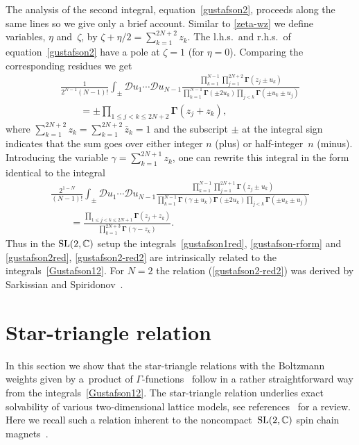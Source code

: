 \documentclass[pdftex]{sigma}
\numberwithin{equation}{section}
\begin{document}
The analysis of the second integral, equation~\eqref{gustafson2}, proceeds along the same lines so we give only a brief account. Similar to \eqref{zeta-wz} we define variables, $\eta$ and~$\zeta$, by $\zeta+\eta/2=\sum\limits_{k=1}^{2N+2} z_k$. The l.h.s.\ and r.h.s.\ of equation~\eqref{gustafson2} have a pole at $\zeta=1$ (for $\eta=0$). Comparing the corresponding residues we get
\begin{gather}
\frac1{2^{N-1}(N-1)!} \int_\pm \mathcal D u_1\cdots \mathcal D u_{N-1}
\frac{ \prod\limits_{k=1}^{N-1} \prod\limits_{j=1}^{2N+2} \boldsymbol{\Gamma}(z_j\pm u_k)}
{\prod\limits_{k=1}^{N-1}{\boldsymbol{\Gamma}}(\pm 2u_k) \prod\limits_{j<k} {\boldsymbol{\Gamma}} (\pm u_k\pm u_j)}\nonumber\\
\qquad{} = \pm {\prod\limits_{1\leq j<k\leq 2N+2}{\boldsymbol{\Gamma}}(z_j + z_k)} ,\label{gustafson2red}
\end{gather}
where $\sum\limits_{k=1}^{2N+2} z_k=\sum\limits_{k=1}^{2N+2} \bar z_k=1$ and the subscript $\pm$ at the integral sign indicates that
the sum goes over either integer $n$ (plus) or half-integer~$n$ (minus). Introducing the variable
$\gamma=\sum\limits_{k=1}^{2N+1} z_k$, one can rewrite this integral in the form identical to the
integral~\cite[equation~(5.4)]{Gustafson92}
\begin{gather}
\frac{2^{1-N}}{(N-1)!}
\int_\pm \mathcal D u_1\cdots \mathcal Du_{N-1}
\frac{
 \prod\limits_{k=1}^{N-1} \prod\limits_{j=1}^{2N+1}
 \boldsymbol{\Gamma}(z_j\pm u_k)}
{\prod\limits_{k=1}^{N-1}\boldsymbol\Gamma(\gamma\pm u_k){\boldsymbol{\Gamma}}(\pm 2u_k)
\prod\limits_{j<k} {\boldsymbol{\Gamma}} (\pm u_k\pm u_j)}\nonumber\\
\qquad{} = \frac{\prod\limits_{1\leq j<k\leq 2N+1}{\boldsymbol{\Gamma}}(z_j + z_k)}{\prod\limits_{k=1}^{2N+3} \boldsymbol\Gamma(\gamma-z_k)}.\label{gustafson2-red2}
\end{gather}
Thus in the ${\rm SL}(2,\mathbb C)$ setup the integrals~\eqref{gustafson1red}, \eqref{gustafson-rform} and \eqref{gustafson2red}, \eqref{gustafson2-red2} are intrinsically related to the integrals~\eqref{Gustafson12}. For $N=2$ the relation (\ref{gustafson2-red2}) was derived by Sarkissian and Spiridonov~\cite{Spir}.

\section{Star-triangle relation}\label{sect:star-triangle}

In this section we show that the star-triangle relations with the Boltzmann weights given by a~product of $\Gamma$-functions~\cite{Bazhanov:2007vg,Kels:2013ola,Kels:2015bda} follow in a rather straightforward way from the integrals~\eqref{Gustafson12}. The star-triangle relation underlies exact solvability of various two-dimensional lattice models, see references~\cite{Baxter:1982zz,Bazhanov:2016ajm} for a review. Here we recall such a relation inherent to the noncompact~${\rm SL}(2,\mathbb C)$ spin chain magnets~\cite{MR1866770}.
\end{document}
